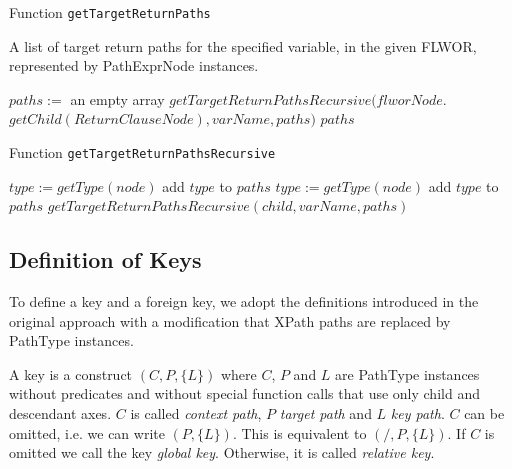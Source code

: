 \begin{algorithm}
\caption{Function \texttt{getTargetReturnPaths}}
\label{ALG_function_get_target_return_paths}
\begin{algorithmic}[1]
\ENSURE A list of target return paths for the specified variable, in the given FLWOR, represented by PathExprNode instances.

\STATE $paths :=$ an empty array
\STATE $getTargetReturnPathsRecursive(flworNode.$ $getChild(ReturnClauseNode), varName, paths)$
\RETURN $paths$
\end{algorithmic}
\end{algorithm}

\begin{algorithm}
\caption{Function \texttt{getTargetReturnPathsRecursive}}
\label{ALG_function_get_target_return_paths_recursive}
\begin{algorithmic}[1]

	\STATE $type := getType(node)$
		\STATE add $type$ to $paths$
	\ENDIF
{}
		\STATE $type := getType(node)$
			\STATE add $type$ to $paths$
		\ENDIF
	\ENDIF
\ENDIF
{}
	\STATE $getTargetReturnPathsRecursive(child, varName, paths)$
\ENDFOR
\end{algorithmic}
\end{algorithm}

\subsection{Definition of Keys}
To define a key and a foreign key, we adopt the definitions introduced in the original approach \cite{Necasky:2009:DXK:1529282.1529414} with a modification that XPath paths are replaced by PathType instances.

\begin{define}[Key]
A key is a construct $(C, P, \{L\})$ where $C$, $P$ and $L$ are PathType instances without predicates and without special function calls that use only child and descendant axes. $C$ is called \emph{context path}, $P$ \emph{target path} and $L$ \emph{key path}. $C$ can be omitted, i.e. we can write $(P, \{L\})$. This is equivalent to $(/, P, \{L\})$. If $C$ is omitted we call the key \emph{global key}. Otherwise, it is called \emph{relative key}.
\end{define}

